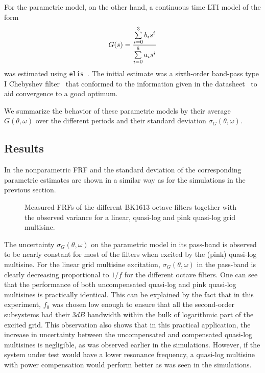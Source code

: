     For the parametric model, on the other hand, a continuous time \gls{LTI} model of the form
    \begin{equation}
      G(s) = \frac{\sum\limits_{i=0}^3 b_i s^i}{\sum\limits_{i=0}^6 a_i s^i}
    \end{equation}
    was estimated using \texttt{elis}~\citep{FDIDENT}.
    The initial estimate was a sixth-order band-pass type I Chebyshev filter~\citep{Zverev1967} that conformed to the information given in the datasheet~\citep{datasheet_bk1613} to aid convergence to a good optimum.

    We summarize the behavior of these parametric models by their average $G\left(\theta,\omega \right)$ over the different periods and their standard deviation $\sigma_G\left(\theta,\omega \right)$.

    \subsection{Results}
    In  the nonparametric \gls{FRF} and the standard deviation of the corresponding parametric estimates are shown in a similar way as for the simulations in the previous section.

    \begin{figure}%
    \centering
      \setlength{}
      \setlength\figureheight{0.68\figurewidth}
    
    \caption[Measured FRFs of all BK1613 octave filters and their variance for different excitation signals.]{Measured FRFs of the different \bruelkjaer BK1613 octave filters together with the observed variance for a linear, quasi-log and pink quasi-log grid multisine.}
      \label{fig:excitation:measurements}
    \end{figure}

    The uncertainty $\sigma_G\left(\theta,\omega\right)$ on the parametric model in its pass-band is observed to be nearly constant for most of the filters when excited by the (pink) quasi-log multisine.
    For the linear grid multisine excitation, $\sigma_G\left(\theta,\omega\right)$ in the pass-band is clearly decreasing proportional to $1 / f$ for the different octave filters.
    One can see that the performance of both uncompensated quasi-log and pink quasi-log multisines is practically identical.
    This can be explained by the fact that in this experiment, $f_0$ was chosen low enough to ensure that all the second-order subsystems had their $3\unit{dB}$ bandwidth within the bulk of logarithmic part of the excited grid.
    This observation also shows that in this practical application, the increase in uncertainty between the uncompensated and compensated quasi-log multisines is negligible, as was observed earlier in the simulations.
    However, if the system under test would have a lower resonance frequency, a quasi-log multisine with power compensation would perform better as was seen in the simulations.

